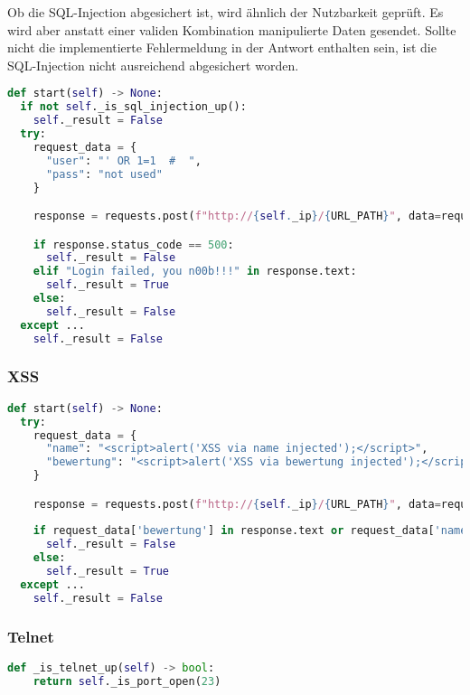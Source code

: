 Ob die SQL-Injection abgesichert ist, wird ähnlich der Nutzbarkeit geprüft. Es wird aber anstatt einer validen Kombination manipulierte Daten gesendet. Sollte nicht die implementierte Fehlermeldung  in der Antwort enthalten sein, ist die SQL-Injection nicht ausreichend abgesichert worden.

\begin{lstlisting}[language=Python, frame=single, caption={Big Brother SQL-Injection Save}, captionpos=b, label={lst:bigbrother-sql-injection-save}]
def start(self) -> None:
  if not self._is_sql_injection_up():
    self._result = False
  try:
    request_data = {
      "user": "' OR 1=1  #  ",
      "pass": "not used"
    }

    response = requests.post(f"http://{self._ip}/{URL_PATH}", data=request_data)

    if response.status_code == 500:
      self._result = False
    elif "Login failed, you n00b!!!" in response.text:
      self._result = True
    else:
      self._result = False
  except ...
    self._result = False
\end{lstlisting}

\subsubsection{XSS}

\begin{lstlisting}[language=Python, frame=single, caption={Big Brother XSS Save}, captionpos=b, label={lst:bigbrother-xss-save}]
def start(self) -> None:
  try:
    request_data = {
      "name": "<script>alert('XSS via name injected');</script>",
      "bewertung": "<script>alert('XSS via bewertung injected');</script>"
    }

    response = requests.post(f"http://{self._ip}/{URL_PATH}", data=request_data)
    
    if request_data['bewertung'] in response.text or request_data['name'] in response.text:
      self._result = False
    else:
      self._result = True
  except ...
    self._result = False
\end{lstlisting}

\subsubsection{Telnet}

\begin{lstlisting}[language=Python, frame=single, caption={Big Brother Telnet}, captionpos=b, label={lst:bigbrother-telnet}]
def _is_telnet_up(self) -> bool:
	return self._is_port_open(23)
\end{lstlisting}

